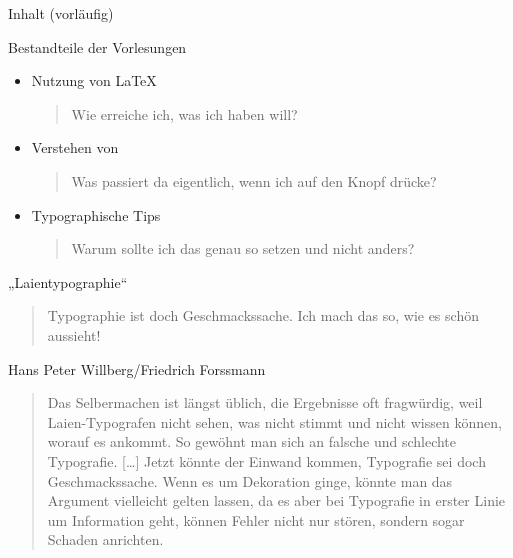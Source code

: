 \begin{frame}{Inhalt (vorläufig)}
\end{frame}

\begin{frame}{Bestandteile der Vorlesungen}
\begin{itemize}
\item  Nutzung von \LaTeX
\\ \begin{quote}\alert{Wie} erreiche ich, was ich haben will?\end{quote}
\item Verstehen von \LaTeXTeX
\\ \begin{quote} \alert{Was} passiert da eigentlich, wenn ich auf den Knopf drücke?\end{quote}
\item Typographische Tips
\\ \begin{quote}\alert{Warum} sollte ich das genau so setzen und nicht anders?\end{quote}
\end{itemize}
\end{frame}

\begin{frame}{„Laientypographie“}
\begin{quote}
Typographie ist doch Geschmackssache. Ich mach das so, wie es schön aussieht!
\end{quote}
\pause
\begin{block}{Hans Peter Willberg/Friedrich Forssmann}
\begin{quotation}Das Selbermachen ist längst üblich, die Ergebnisse oft fragwürdig, weil Laien-Typografen nicht sehen, was nicht stimmt und nicht wissen können, worauf es ankommt. So gewöhnt man sich an falsche und schlechte Typografie. [\dots] Jetzt könnte der Einwand kommen, Typografie sei doch Geschmackssache. Wenn es um Dekoration ginge, könnte man das Argument vielleicht gelten lassen, da es aber bei Typografie in erster Linie um Information geht, können Fehler nicht nur stören, sondern sogar Schaden anrichten.
\end{quotation}
\end{block}
\end{frame}

